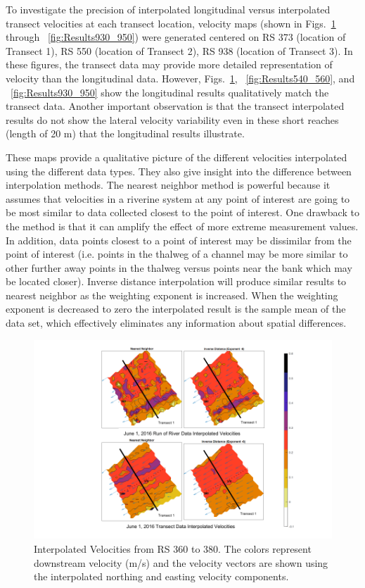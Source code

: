 \documentclass[Journal,letterpaper,BackFigs]{ascelike-new}
\begin{document}
To investigate the precision of interpolated longitudinal versus interpolated transect velocities at each transect location, velocity maps (shown in Figs.~\ref{fig:Results360_380} through ~\ref{fig:Results930_950}) were generated centered on RS 373 (location of Transect 1), RS 550 (location of Transect 2), RS 938 (location of Transect 3). In these figures, the transect data may provide more detailed representation of velocity than the longitudinal data. However, Figs.~\ref{fig:Results360_380}, ~\ref{fig:Results540_560}, and ~\ref{fig:Results930_950} show the longitudinal results qualitatively match the transect data. Another important observation is that the transect interpolated results do not show the lateral velocity variability even in these short reaches (length of 20 m) that the longitudinal results illustrate.

These maps provide a qualitative picture of the different velocities interpolated using the different data types. They also give insight into the difference between interpolation methods. The nearest neighbor method is powerful because it assumes that velocities in a riverine system at any point of interest are going to be most similar to data collected closest to the point of interest. One drawback to the method is that it can amplify the effect of more extreme measurement values. In addition, data points closest to a point of interest may be dissimilar from the point of interest (i.e. points in the thalweg of a channel may be more similar to other further away points in the thalweg versus points near the bank which may be located closer). Inverse distance interpolation will produce similar results to nearest neighbor as the weighting exponent is increased. When the weighting exponent is decreased to zero the interpolated result is the sample mean of the data set, which effectively eliminates any information about spatial differences. 

\begin{figure}
\centering
\includegraphics[width=5.5in]{Results360_380.pdf}
\caption{Interpolated Velocities from RS 360 to 380. The colors represent downstream velocity (m/s) and the velocity vectors are shown using the interpolated northing and easting velocity components.}
\label{fig:Results360_380}
\end{figure}
\end{document}
